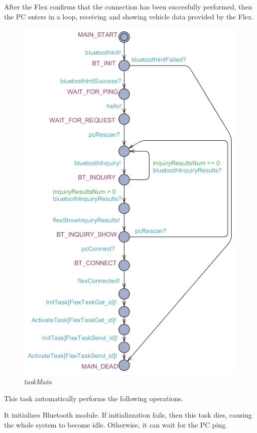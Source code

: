 \documentclass[paper=a4, fontsize=11pt]{scrartcl} %
\numberwithin{equation}{section} %
\numberwithin{figure}{section} %
\numberwithin{table}{section} %
\begin{document}
After the Flex confirms that the connection has been succesfully performed, then the PC enters in a loop, receiving and showing vehicle data provided by the Flex.

\begin{figure}[H]
  \centering
  \includegraphics[width=5in]{img/FLEX-PC_taskMain}
  \caption{\textit{taskMain}}
\end{figure}

This task automatically performs the following operations.

It initializes Bluetooth module. If initializzation fails, then this task dies, causing the whole system to become idle. Otherwise, it can wait for the PC ping.
\end{document}
